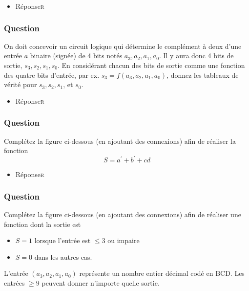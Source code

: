 \documentclass[11pt]{article}
\begin{document}
\begin{itemize}
\item Réponse\hfill{}\textsc{r}
\label{sec:orga2d643b}
\end{itemize}

\subsubsection*{Question}
\label{sec:org77bd441}
On doit concevoir un circuit logique qui détermine le complément à deux
  d'une entrée \(a\) binaire (signée) de 4 bits notés
  \(a_3, a_2, a_1, a_0\). Il y aura donc 4 bits de sortie, \(s_3,
      s_2, s_1, s_0\). En considérant chacun des bits de sortie comme une
  fonction des quatre bits d'entrée, par ex. \(s_3 = f(a_3, a_2, a_1,
      a_0)\), donnez les tableaux de vérité pour \(s_3, s_2, s_1\), et \(s_0\).

\begin{itemize}
\item Réponse\hfill{}\textsc{r}
\label{sec:orgaf490df}
\end{itemize}

\subsubsection*{Question}
\label{sec:orgbdb83a5}
Complétez la figure ci-dessous (en ajoutant des connexions) afin de
  réaliser la fonction 
  $$
    S= a^\prime + b^\prime + c d
    $$
  \begin{center}

\end{center}

\begin{itemize}
\item Réponse\hfill{}\textsc{r}
\label{sec:org13e1438}
\end{itemize}

\subsubsection*{Question}
\label{sec:orgea2a442}
Complétez la figure ci-dessous (en ajoutant des connexions) afin de
  réaliser une fonction dont la sortie est 
\begin{itemize}
\item \(S=1\) lorsque l'entrée est \(\leq 3\) ou impaire
\item \(S=0\) dans les autres cas.
\end{itemize}
    L'entrée \((a_3,a_2,a_1, a_0)\) représente un nombre entier
   décimal codé en BCD. Les entrées \(\geq 9\) peuvent donner
   n'importe quelle sortie.
\begin{center}

\end{center}
\end{document}
